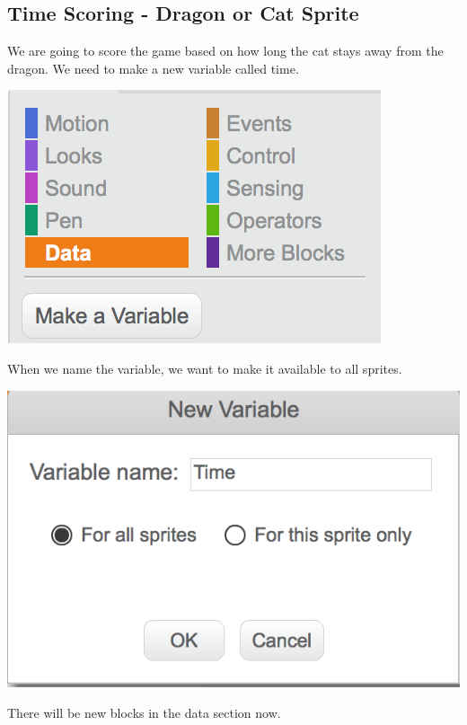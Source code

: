 \documentclass[12pt]{article}
\begin{document}
	
	
\subsection*{Time Scoring - Dragon or Cat Sprite}
	\begin{itemize}
		\item We are going to score the game based on how long the cat stays away from the dragon.  We need to make a new variable called time.
		\begin{center}
			\item[] \includegraphics[scale=.80]{./Images/dragon10.png}
		\end{center}
		\newpage
		\item When we name the variable, we want to make it available to all sprites.
		\begin{center}
			\item[] \includegraphics[scale=.80]{./Images/dragon11.png}
		\end{center}
		\item There will be new blocks in the data section now.

\end{itemize}
\end{document}

